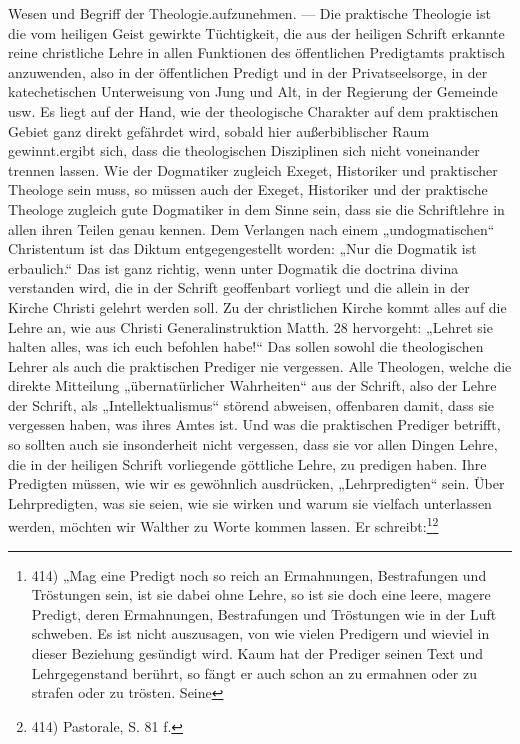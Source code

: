 \label{page:114} \hfill Wesen und Begriff der Theologie.\parwieder aufzunehmen. --- Die praktische Theologie ist die vom heiligen Geist gewirkte Tüchtigkeit, die aus der heiligen Schrift erkannte reine christliche Lehre in allen Funktionen des öffentlichen Predigtamts praktisch anzuwenden, also in der öffentlichen Predigt und in der Privatseelsorge, in der katechetischen Unterweisung von Jung und Alt, in der Regierung der Gemeinde usw. Es liegt auf der Hand, wie der theologische Charakter auf dem praktischen Gebiet ganz direkt gefährdet wird, sobald hier außerbiblischer Raum gewinnt.\parHieraus ergibt sich, dass die theologischen Disziplinen sich nicht voneinander trennen lassen. Wie der Dogmatiker zugleich Exeget, Historiker und praktischer Theologe sein muss, so müssen auch der Exeget, Historiker und der praktische Theologe zugleich gute Dogmatiker in dem Sinne sein, dass sie die Schriftlehre in allen ihren Teilen genau kennen. Dem Verlangen nach einem „undogmatischen“ Christentum ist das Diktum entgegengestellt worden: „Nur die Dogmatik ist erbaulich.“ Das ist ganz richtig, wenn unter Dogmatik die doctrina divina verstanden wird, die in der Schrift geoffenbart vorliegt und die allein in der Kirche Christi gelehrt werden soll. Zu der christlichen Kirche kommt alles auf die Lehre an, wie aus Christi Generalinstruktion Matth. 28 hervorgeht: „Lehret sie halten alles, was ich euch befohlen habe!“ Das sollen sowohl die theologischen Lehrer als auch die praktischen Prediger nie vergessen. Alle Theologen, welche die direkte Mitteilung „übernatürlicher Wahrheiten“ aus der Schrift, also der Lehre der Schrift, als „Intellektualismus“ störend abweisen, offenbaren damit, dass sie vergessen haben, was ihres Amtes ist. Und was die praktischen Prediger betrifft, so sollten auch sie insonderheit nicht vergessen, dass sie vor allen Dingen Lehre, die in der heiligen Schrift vorliegende göttliche Lehre, zu predigen haben. Ihre Predigten müssen, wie wir es gewöhnlich ausdrücken, „Lehrpredigten“ sein. Über Lehrpredigten, was sie seien, wie sie wirken und warum sie vielfach unterlassen werden, möchten wir Walther zu Worte kommen lassen. Er schreibt:\footnote{414) „Mag eine Predigt noch so reich an Ermahnungen, Bestrafungen und Tröstungen sein, ist sie dabei ohne Lehre, so ist sie doch eine leere, magere Predigt, deren Ermahnungen, Bestrafungen und Tröstungen wie in der Luft schweben. Es ist nicht auszusagen, von wie vielen Predigern und wieviel in dieser Beziehung gesündigt wird. Kaum hat der Prediger seinen Text und Lehrgegenstand berührt, so fängt er auch schon an zu ermahnen oder zu strafen oder zu trösten. Seine}\footnote{414) Pastorale, S. 81 f.}